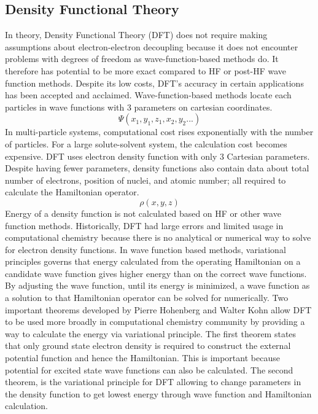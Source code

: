 \documentclass[
journal=jpcbfk, %
manuscript=article]{achemso}
\begin{document}
	\subsection{Density Functional Theory}
	In theory, Density Functional Theory (DFT) does not require making assumptions about electron-electron decoupling because it does not encounter problems with degrees of freedom as wave-function-based methods do. It therefore has potential to be more exact  compared to HF or post-HF wave function methods. Despite its low costs, DFT's accuracy in certain applications has been accepted and acclaimed.\cite{Baerends1997,Sousa2007}	Wave-function-based methods locate each particles in wave functions with 3 parameters on cartesian coordinates.
	\begin{equation}
	\label{eq:psi}
	\Psi (x_{1}, y_{1}, z_{1}, x_{2}, y_{2}...)
	\end{equation}
	In multi-particle systems, computational cost rises exponentially with the number of particles. For a large solute-solvent system, the calculation cost becomes expensive. DFT uses electron density function with only 3 Cartesian parameters. Despite having fewer parameters, density functions also contain data about total number of electrons, position of nuclei, and atomic number; all required to calculate the Hamiltonian operator.
	\begin{equation}
	\label{eq:rho}
	\rho (x, y, z)
	\end{equation}
	Energy of a density function is not calculated based on HF or other wave function methods. Historically, DFT had large errors and limited usage in computational chemistry because there is no analytical or numerical way to solve for electron density functions. In wave function based methods, variational principles governs that energy calculated from the operating Hamiltonian on a candidate wave function gives higher energy than on the correct wave functions. By adjusting the wave function, until its energy is minimized, a wave function as a solution to that Hamiltonian operator can be solved for numerically. Two important theorems developed by Pierre Hohenberg and Walter Kohn allow DFT to be used more broadly in computational chemistry community by providing a way to calculate the energy via variational principle.\cite{Hohenberg1964} The first theorem states that only ground state electron density is required to construct the external potential function and hence the Hamiltonian. This is important because potential for excited state wave functions can also be calculated. The second theorem, is the variational principle for DFT allowing to change parameters in the density function to get lowest energy through wave function and Hamiltonian calculation.
\end{document}
